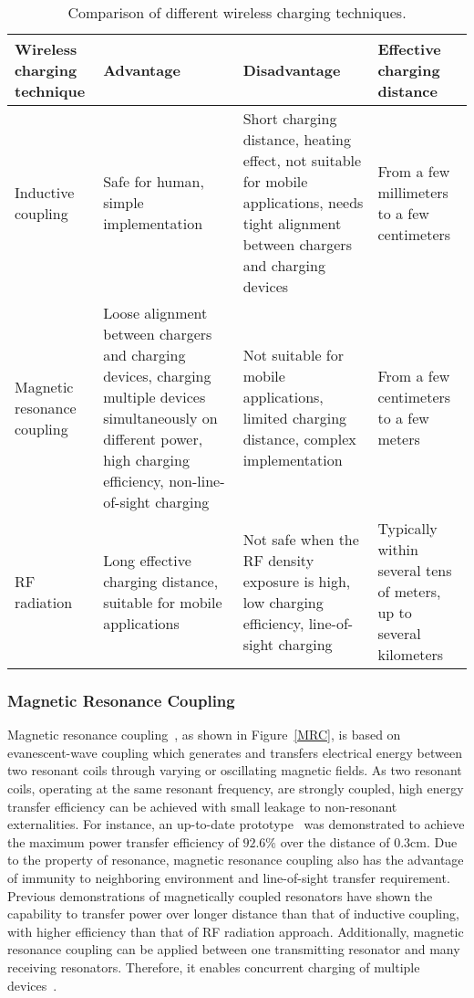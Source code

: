 \documentclass[twocolumn,10pt]{IEEEtran}
\begin{document}
\begin{table*} \small \centering
\caption{\footnotesize Comparison of different wireless charging techniques.} \label{WET}
\begin{tabular}{|p{2.5cm}|p{5cm}|p{5cm}|p{3.5cm}|} 
\hline
\footnotesize {\bf Wireless charging technique} & {\bf Advantage} & {\bf Disadvantage} & {\bf Effective charging distance}    \\
\hline
Inductive coupling & Safe for human, simple implementation  & Short charging distance, heating effect, not suitable for mobile applications, needs tight alignment between chargers and charging devices & From a few millimeters to a few centimeters \\ \hline
Magnetic resonance coupling & Loose alignment between chargers and charging devices, charging multiple devices simultaneously on different power, high charging efficiency, non-line-of-sight charging  & Not suitable for mobile applications, limited charging distance, complex implementation &  From a few centimeters to a few meters \\ \hline
RF radiation & Long effective charging distance, suitable for mobile applications & Not safe when the RF density exposure is high, low charging efficiency, line-of-sight charging  & Typically within several tens of meters, up to several kilometers \\ \hline
\end{tabular}
\end{table*}  
 
\subsubsection{Magnetic Resonance Coupling}

Magnetic resonance coupling~\cite{A.2008Karalis}, as shown in Figure~\ref{MRC}, is based on evanescent-wave coupling which generates and transfers electrical energy between two resonant coils through varying or oscillating magnetic fields. As two resonant coils, operating at the same resonant frequency, are strongly coupled, high energy transfer efficiency can be achieved with small leakage to non-resonant externalities.
For instance, an up-to-date prototype~\cite{X.Li2015} was demonstrated to achieve the maximum power transfer efficiency of $92.6\%$ over the distance of 0.3cm. 
Due to the property of resonance, magnetic resonance coupling also has the advantage of immunity to neighboring environment and line-of-sight transfer requirement.  
Previous demonstrations \cite{Kurs2007A,B.2009Cannon,C.2008Zhu,N.2009Low} of magnetically coupled resonators have shown the capability to transfer power over longer distance than that of inductive coupling, with higher efficiency than that of RF radiation approach. Additionally, magnetic resonance coupling can be applied between one transmitting resonator and many receiving resonators. Therefore, it enables concurrent charging of multiple devices~\cite{A.2010Kurs,S.2011Rajagopal,J.2012Choi,Z.2012Kim,B.2009Cannon}.
\end{document}
